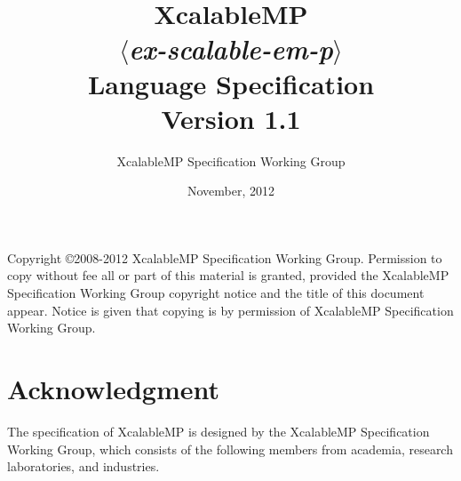 \documentclass[a4paper,11pt,twoside]{report}
\title{{\Huge XcalableMP}\\
$\langle${\it ex-scalable-em-p}$\rangle$\\
Language Specification\\
\vspace{2cm}
Version 1.1\\}
\author{
\Large XcalableMP Specification Working Group\\
}
\date{\vspace{4cm}\Large November, 2012}
\def\XMP{XcalableMP}
\begin{document}
\maketitle

Copyright \copyright 2008-2012 {\XMP} Specification Working Group.
Permission to copy without fee all or part of this material is granted,
provided the {\XMP} Specification Working Group copyright notice and the
title of this document appear. Notice is given that copying is by permission
of {\XMP} Specification Working Group.

\tableofcontents
\listoffigures

\chapter*{Acknowledgment}

The specification of {\XMP} is designed by the {\XMP} Specification
Working Group, which consists of the following members from academia,
research laboratories, and industries.
\end{document}
